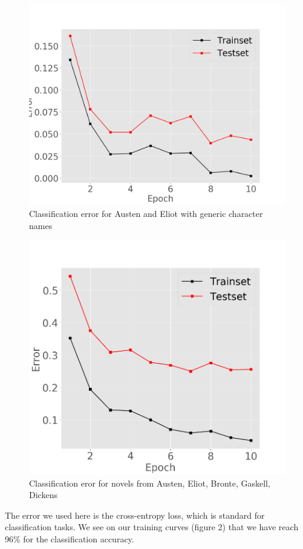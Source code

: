 \begin{figure}[ht]
\vskip 0.2in
\begin{center}
\centerline{\includegraphics[width=\columnwidth]{gejaclasswithout}}
\caption{Classification error for Austen and Eliot with generic character names}
\end{center}
\vskip -0.2in
\end{figure}
\begin{figure}[ht]
\vskip 0.2in
\begin{center}
\centerline{\includegraphics[width=\columnwidth]{yeet}}
\caption{Classification eror for novels from Austen, Eliot, Bronte, Gaskell, Dickens}
\label{fig2}
\end{center}
\vskip -0.2in
\end{figure}
The error we used here is the cross-entropy loss, which is standard for 
classification tasks. We see on our training curves (figure 2) that we 
have reach 96\% for the classification accuracy.

